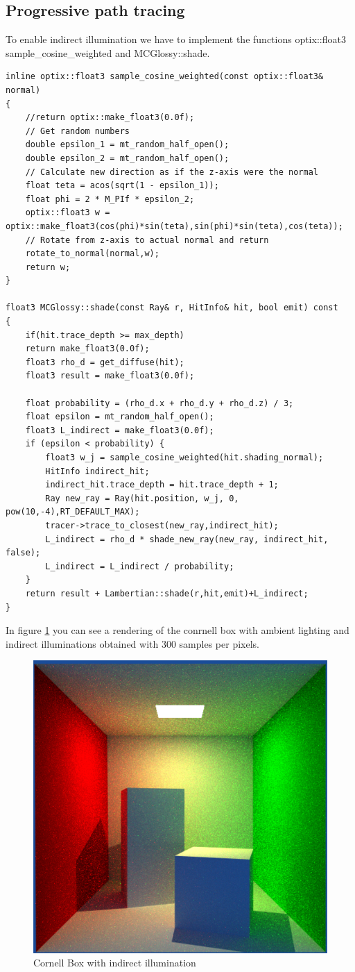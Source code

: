 \subsection{Progressive path tracing}
To enable indirect illumination we have to implement the functions optix::float3 sample\_cosine\_weighted and MCGlossy::shade.
\begin{lstlisting}
inline optix::float3 sample_cosine_weighted(const optix::float3& normal)
{
	//return optix::make_float3(0.0f);
	// Get random numbers
	double epsilon_1 = mt_random_half_open();
	double epsilon_2 = mt_random_half_open();
	// Calculate new direction as if the z-axis were the normal
	float teta = acos(sqrt(1 - epsilon_1));
	float phi = 2 * M_PIf * epsilon_2;
	optix::float3 w = optix::make_float3(cos(phi)*sin(teta),sin(phi)*sin(teta),cos(teta));
	// Rotate from z-axis to actual normal and return
	rotate_to_normal(normal,w);
	return w;
}

float3 MCGlossy::shade(const Ray& r, HitInfo& hit, bool emit) const
{
	if(hit.trace_depth >= max_depth)
	return make_float3(0.0f);
	float3 rho_d = get_diffuse(hit);
	float3 result = make_float3(0.0f);
	
	float probability = (rho_d.x + rho_d.y + rho_d.z) / 3;
	float epsilon = mt_random_half_open();
	float3 L_indirect = make_float3(0.0f);
	if (epsilon < probability) {
		float3 w_j = sample_cosine_weighted(hit.shading_normal);
		HitInfo indirect_hit;
		indirect_hit.trace_depth = hit.trace_depth + 1;
		Ray new_ray = Ray(hit.position, w_j, 0, pow(10,-4),RT_DEFAULT_MAX);
		tracer->trace_to_closest(new_ray,indirect_hit);
		L_indirect = rho_d * shade_new_ray(new_ray, indirect_hit, false);
		L_indirect = L_indirect / probability;
	}
	return result + Lambertian::shade(r,hit,emit)+L_indirect;
}
\end{lstlisting}
In figure \ref{fig:ambient_light} you can see a rendering of the conrnell box with ambient lighting and indirect illuminations obtained with 300 samples per pixels.	
\begin{figure}[H]
	\centering
	\includegraphics[scale=\imagescale]{images/worksheet_6/ambient_light}
	\caption{Cornell Box with indirect illumination}
	\label{fig:ambient_light}
\end{figure}